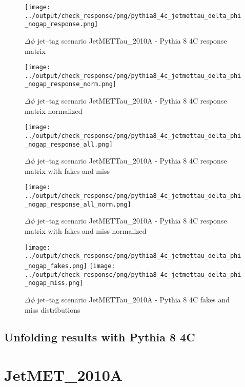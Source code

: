 \documentclass[11pt]{book}
\begin{document}
\begin{figure}[ht]
\centering
\texttt{[image: ../output/check\_response/png/pythia8\_4c\_jetmettau\_delta\_phi\_nogap\_response.png]}
\caption{$\Delta\phi$ jet--tag scenario JetMETTau\_2010A - Pythia 8 4C response matrix}
\label{p8_jetmettau_delta_phi_nogap_response}
\end{figure}

\begin{figure}[ht]
\centering
\texttt{[image: ../output/check\_response/png/pythia8\_4c\_jetmettau\_delta\_phi\_nogap\_response\_norm.png]}
\caption{$\Delta\phi$ jet--tag scenario JetMETTau\_2010A - Pythia 8 4C response matrix normalized}
\label{p8_jetmettau_delta_phi_nogap_response_norm}
\end{figure}

\begin{figure}[ht]
\centering
\texttt{[image: ../output/check\_response/png/pythia8\_4c\_jetmettau\_delta\_phi\_nogap\_response\_all.png]}
\caption{$\Delta\phi$ jet--tag scenario JetMETTau\_2010A - Pythia 8 4C response matrix with fakes and miss}
\label{p8_jetmettau_delta_phi_nogap_response_all}
\end{figure}

\begin{figure}[ht]
\centering
\texttt{[image: ../output/check\_response/png/pythia8\_4c\_jetmettau\_delta\_phi\_nogap\_response\_all\_norm.png]}
\caption{$\Delta\phi$ jet--tag scenario JetMETTau\_2010A - Pythia 8 4C response matrix with fakes and miss normalized}
\label{p8_jetmettau_delta_phi_nogap_response_all_norm}
\end{figure}

\begin{figure}[ht]
\centering
\texttt{[image: ../output/check\_response/png/pythia8\_4c\_jetmettau\_delta\_phi\_nogap\_fakes.png]}
\texttt{[image: ../output/check\_response/png/pythia8\_4c\_jetmettau\_delta\_phi\_nogap\_miss.png]}
\caption{$\Delta\phi$ jet--tag scenario JetMETTau\_2010A - Pythia 8 4C fakes and miss distributions}
\label{p8_jetmettau_delta_phi_nogap_fakesmiss}
\end{figure}


\clearpage
\subsection{Unfolding results with Pythia 8 4C}


\section{JetMET\_2010A}
\end{document}
